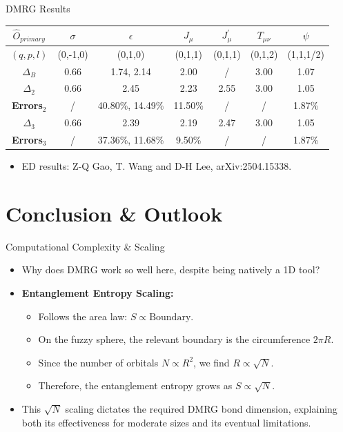 \documentclass[xcolor=table, 11pt, aspectratio=169]{beamer}
\begin{document}
\begin{frame}{DMRG Results}
      \begin{tabular}{c|c|c|c|c|c|c}
      \hline
      \textbf{$\hat{O}_{primary}$} & $\sigma$ & $\epsilon$ & $J_{\mu}$ & $J_{\mu}^\prime$ & $T_{\mu\nu}$ & $\psi$\\
      \hline
      \textbf{$(q,p,l)$} & (0,-1,0) & (0,1,0) & (0,1,1) & (0,1,1) & (0,1,2) & (1,1,1/2)\\
      \hline
      \textbf{$\Delta_B$} & 0.66 & 1.74, 2.14 & 2.00 & / & 3.00 & 1.07\\
      \hline
      \textbf{$\Delta_{2}$} & 0.66 & 2.45 & 2.23 & 2.55 & 3.00 & 1.05\\
      \hline
      \textbf{Errors$_2$} & / & 40.80\%, 14.49\% & 11.50\% & / & / & 1.87\%\\
      \hline
      \textbf{$\Delta_{3}$} & 0.66 & 2.39 & 2.19 & 2.47 & 3.00 & 1.05\\
      \hline
      \textbf{Errors$_3$} & / & 37.36\%, 11.68\% & 9.50\% & / & / & 1.87\%\\
      \hline
    \end{tabular}
    \begin{itemize}
    \item ED results: Z-Q Gao, T. Wang and D-H Lee, arXiv:2504.15338.
    \end{itemize}
\end{frame}

\section{Conclusion \& Outlook}
\begin{frame}{Computational Complexity \& Scaling}
    \begin{itemize}
        \item Why does DMRG work so well here, despite being natively a 1D tool?
        \item \textbf{Entanglement Entropy Scaling:}
        \begin{itemize}
            \item Follows the area law: $S \propto \text{Boundary}$.
            \item On the fuzzy sphere, the relevant boundary is the circumference $2\pi R$.
            \item Since the number of orbitals $N \propto R^2$, we find $R \propto \sqrt{N}$.
            \item Therefore, the entanglement entropy grows as $S \propto \sqrt{N}$.
        \end{itemize}
        \item This $\sqrt{N}$ scaling dictates the required DMRG bond dimension, explaining both its effectiveness for moderate sizes and its eventual limitations.
    \end{itemize}
\end{frame}
\end{document}
